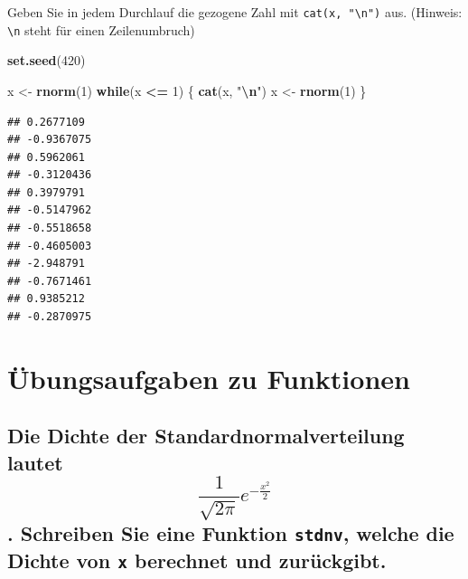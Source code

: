 \documentclass[12pt,a4paper]{article}
\newenvironment{Shaded}{\begin{snugshade}}{\end{snugshade}}
\newcommand{\ControlFlowTok}[1]{\textcolor[rgb]{0.13,0.29,0.53}{\textbf{#1}}}
\newcommand{\DecValTok}[1]{\textcolor[rgb]{0.00,0.00,0.81}{#1}}
\newcommand{\FunctionTok}[1]{\textcolor[rgb]{0.13,0.29,0.53}{\textbf{#1}}}
\newcommand{\NormalTok}[1]{#1}
\newcommand{\OtherTok}[1]{\textcolor[rgb]{0.56,0.35,0.01}{#1}}
\newcommand{\SpecialCharTok}[1]{\textcolor[rgb]{0.81,0.36,0.00}{\textbf{#1}}}
\newcommand{\StringTok}[1]{\textcolor[rgb]{0.31,0.60,0.02}{#1}}
\begin{document}
Geben Sie in jedem Durchlauf die gezogene Zahl mit
\texttt{cat(x,\ "\textbackslash{}n")} aus. (Hinweis:
\texttt{\textbackslash{}n} steht für einen Zeilenumbruch)

\begin{Shaded}
\begin{Highlighting}[]
    \FunctionTok{set.seed}\NormalTok{(}\DecValTok{420}\NormalTok{)}
    
\NormalTok{    x }\OtherTok{\textless{}{-}} \FunctionTok{rnorm}\NormalTok{(}\DecValTok{1}\NormalTok{)}
    \ControlFlowTok{while}\NormalTok{(x }\SpecialCharTok{\textless{}=} \DecValTok{1}\NormalTok{) \{}
      \FunctionTok{cat}\NormalTok{(x, }\StringTok{"}\SpecialCharTok{\textbackslash{}n}\StringTok{"}\NormalTok{)}
\NormalTok{      x }\OtherTok{\textless{}{-}} \FunctionTok{rnorm}\NormalTok{(}\DecValTok{1}\NormalTok{)}
\NormalTok{    \}}
\end{Highlighting}
\end{Shaded}

\begin{verbatim}
## 0.2677109 
## -0.9367075 
## 0.5962061 
## -0.3120436 
## 0.3979791 
## -0.5147962 
## -0.5518658 
## -0.4605003 
## -2.948791 
## -0.7671461 
## 0.9385212 
## -0.2870975
\end{verbatim}

\hypertarget{uxfcbungsaufgaben-zu-funktionen}{%
\section{Übungsaufgaben zu
Funktionen}\label{uxfcbungsaufgaben-zu-funktionen}}

\hypertarget{die-dichte-der-standardnormalverteilung-lautet-displaystyle-frac1sqrt2pi-e-fracx22.-schreiben-sie-eine-funktion-stdnv-welche-die-dichte-von-x-berechnet-und-zuruxfcckgibt.}{%
\subsection{\texorpdfstring{Die Dichte der Standardnormalverteilung
lautet \[\displaystyle \frac{1}{\sqrt{2\pi}} e^{-\frac{x^2}{2}}\].
Schreiben Sie eine Funktion \texttt{stdnv}, welche die Dichte von
\texttt{x} berechnet und
zurückgibt.}{Die Dichte der Standardnormalverteilung lautet \textbackslash displaystyle \textbackslash frac\{1\}\{\textbackslash sqrt\{2\textbackslash pi\}\} e\^{}\{-\textbackslash frac\{x\^{}2\}\{2\}\}. Schreiben Sie eine Funktion stdnv, welche die Dichte von x berechnet und zurückgibt.}}\label{die-dichte-der-standardnormalverteilung-lautet-displaystyle-frac1sqrt2pi-e-fracx22.-schreiben-sie-eine-funktion-stdnv-welche-die-dichte-von-x-berechnet-und-zuruxfcckgibt.}}
\end{document}
